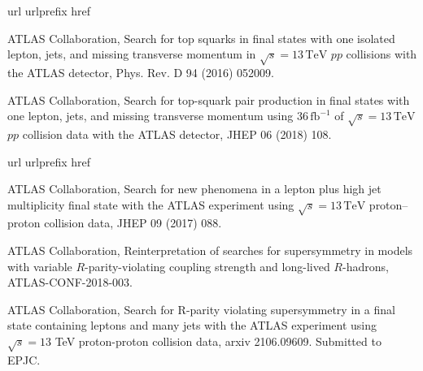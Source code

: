 \begin{thebibliography}{10}
\makeatletter
\renewcommand\@biblabel[1]{}
\makeatother
\expandafter\ifx\csname url\endcsname\relax
  \def\url#1{\texttt{#1}}\fi
\expandafter\ifx\csname urlprefix\endcsname\relax\def\urlprefix{URL }\fi
\expandafter\ifx\csname href\endcsname\relax
  \def\href#1#2{#2} \def\path#1{#1}\fi
  
{ATLAS Collaboration}, {Search for top squarks in final states with one
  isolated lepton, jets, and missing transverse momentum in \(\sqrt{s} =
  13\,\text{TeV}\) \(pp\) collisions with the ATLAS detector},
  \href {http://dx.doi.org/10.1103/PhysRevD.94.052009}
  {Phys. Rev. D 94 (2016) 052009}.


{ATLAS Collaboration}, {Search for top-squark pair production in final states
  with one lepton, jets, and missing transverse momentum using
  \(36\,\text{fb}^{-1}\) of \(\sqrt{s} = 13\,\text{TeV}\) \(pp\) collision data
  with the ATLAS detector}, 
  \href {http://dx.doi.org/10.1007/JHEP06(2018)108}
  {JHEP 06 (2018) 108}.
  
\end{thebibliography}

\begin{thebibliography}{10}
\makeatletter
\renewcommand\@biblabel[1]{}
\makeatother
\expandafter\ifx\csname url\endcsname\relax
  \def\url#1{\texttt{#1}}\fi
\expandafter\ifx\csname urlprefix\endcsname\relax\def\urlprefix{URL }\fi
\expandafter\ifx\csname href\endcsname\relax
  \def\href#1#2{#2} \def\path#1{#1}\fi

{ATLAS Collaboration}, {Search for new phenomena in a lepton plus high jet
  multiplicity final state with the ATLAS experiment using \(\sqrt{s} =
  13\,\text{TeV}\) proton--proton collision data}, 
  \href {http://dx.doi.org/10.1007/JHEP09(2017)088}
  {JHEP 09 (2017) 088}.
  
  
{ATLAS Collaboration}, {Reinterpretation of searches for
  supersymmetry in models with variable \(R\)-parity-violating coupling
  strength and long-lived \(R\)-hadrons}, 
  \href{https://atlas.web.cern.ch/Atlas/GROUPS/PHYSICS/CONFNOTES/ATLAS-CONF-2018-003/}{ATLAS-CONF-2018-003}.  


{ATLAS Collaboration}, {Search
  for R-parity violating supersymmetry in a final state containing leptons and
  many jets with the ATLAS experiment using $\sqrt{s}=13$ TeV proton-proton
  collision data}, \href{https://arxiv.org/abs/2106.09609}{arxiv 2106.09609}. Submitted to EPJC.

\end{thebibliography}


